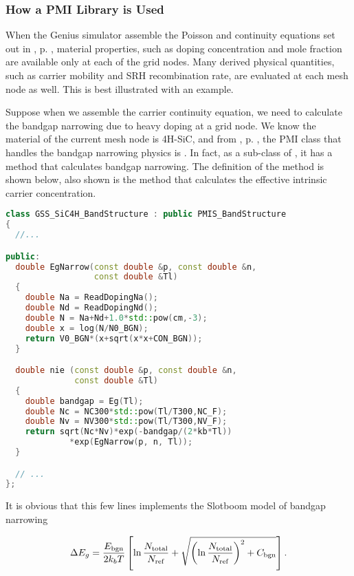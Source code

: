 \documentclass[oneside,12pt]{cgd_book}
\begin{document}
\subsubsection{How a PMI Library is Used}
When the Genius simulator assemble the Poisson and continuity equations set out in
, p. \pageref{sec:Equation:DDML1}, material properties, such as doping concentration and mole fraction are
          available only at each of the grid nodes. Many derived physical quantities, such as carrier mobility and SRH
          recombination rate, are evaluated at each mesh node as well. This is best illustrated with an example.
\par
Suppose when we assemble the carrier continuity equation, we need to calculate the bandgap narrowing due
          to heavy doping at a grid node. We know the material of the current mesh node is 4H-SiC, and from
, p. \pageref{fig:Extend:PMI:Classes}, the PMI class that handles the bandgap narrowing physics is
. In fact, as a sub-class of
, it has a method 
that calculates
          bandgap narrowing. The definition of the method is shown below, also shown is the method
 that calculates the effective intrinsic carrier concentration.
\par
\begin{lstlisting}[language={C++}]
class GSS_SiC4H_BandStructure : public PMIS_BandStructure
{
  //...

public:
  double EgNarrow(const double &p, const double &n,
                  const double &Tl)
  {
    double Na = ReadDopingNa();
    double Nd = ReadDopingNd();
    double N = Na+Nd+1.0*std::pow(cm,-3);
    double x = log(N/N0_BGN);
    return V0_BGN*(x+sqrt(x*x+CON_BGN));
  }

  double nie (const double &p, const double &n,
              const double &Tl)
  {
    double bandgap = Eg(Tl);
    double Nc = NC300*std::pow(Tl/T300,NC_F);
    double Nv = NV300*std::pow(Tl/T300,NV_F);
    return sqrt(Nc*Nv)*exp(-bandgap/(2*kb*Tl))
             *exp(EgNarrow(p, n, Tl));
  }

  // ...
};
\end{lstlisting}
It is obvious that this few lines implements the Slotboom model of bandgap narrowing
\par
\begin{equation}
\Delta E_g = \frac{E_{\rm bgn}}{2k_b T}\left[ \ln \frac{N_{\rm total}}{N_{\rm ref}} + \sqrt
            {\left( \ln \frac{N_{\rm total}}{N_{\rm ref}} \right)^2 + C_{\rm bgn}} \right].
\end{equation}
\end{document}
